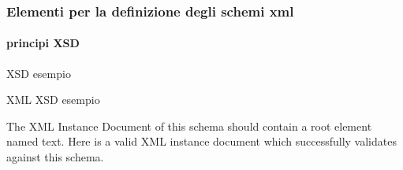 \begin{frame}
    \frametitle{Elementi per la definizione degli schemi xml}
    \framesubtitle{principi XSD}
    \addtocounter{nframe}{1}




    \begin{block}{XSD esempio}
        {\xsdfirst}
    \end{block}

    \begin{block}{XML XSD esempio}
        
        The XML Instance Document of this schema should contain a root element named text. Here is a valid XML instance document which successfully validates against this schema.
        {\xmlfirst}

    \end{block}
    
\end{frame}


